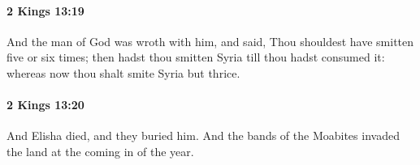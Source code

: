 		\paragraph{2 Kings 13:19} %
			\label{2KINGS-13-19}

			And the man of God was wroth with him, and said, Thou shouldest have smitten five or six times; then hadst thou smitten Syria till thou hadst consumed it: whereas now thou shalt smite Syria but thrice.


		\paragraph{2 Kings 13:20} %
			\label{2KINGS-13-20}

			And Elisha died, and they buried him. And the bands of the Moabites invaded the land at the coming in of the year.


